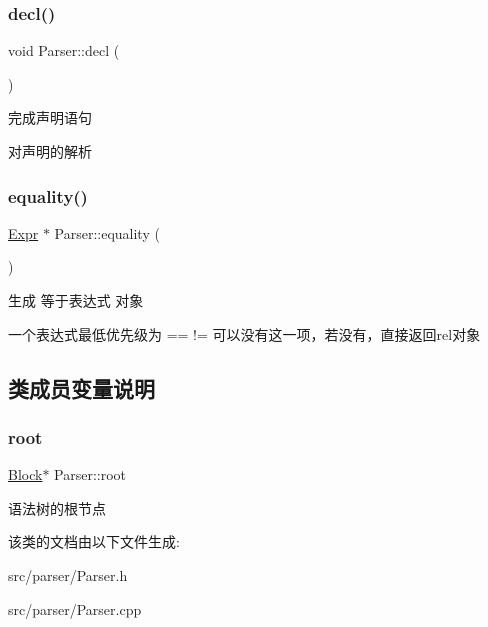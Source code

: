 \subsubsection{\texorpdfstring{decl()}{decl()}}
{\footnotesize\ttfamily void Parser\+::decl (\begin{DoxyParamCaption}{ }\end{DoxyParamCaption})\hspace{0.3cm}{\ttfamily [protected]}}



完成声明语句 

对声明的解析 \mbox{\label{class_parser_acf81bd28478a78855da7271b0dd7a09d}} 
\subsubsection{\texorpdfstring{equality()}{equality()}}
{\footnotesize\ttfamily \hyperlink{class_expr}{Expr} $\ast$ Parser\+::equality (\begin{DoxyParamCaption}{ }\end{DoxyParamCaption})\hspace{0.3cm}{\ttfamily [protected]}}



生成 等于表达式 对象 

一个表达式最低优先级为 == != 可以没有这一项，若没有，直接返回rel对象

\subsection{类成员变量说明}
\mbox{\label{class_parser_a2c2aa893bb15b76ceea0330cad0c75cb}} 
\subsubsection{\texorpdfstring{root}{root}}
{\footnotesize\ttfamily \hyperlink{class_block}{Block}$\ast$ Parser\+::root\hspace{0.3cm}{\ttfamily [protected]}}

语法树的根节点 

该类的文档由以下文件生成\+:\begin{DoxyCompactItemize}
\item 
src/parser/Parser.\+h\item 
src/parser/Parser.\+cpp\end{DoxyCompactItemize}
